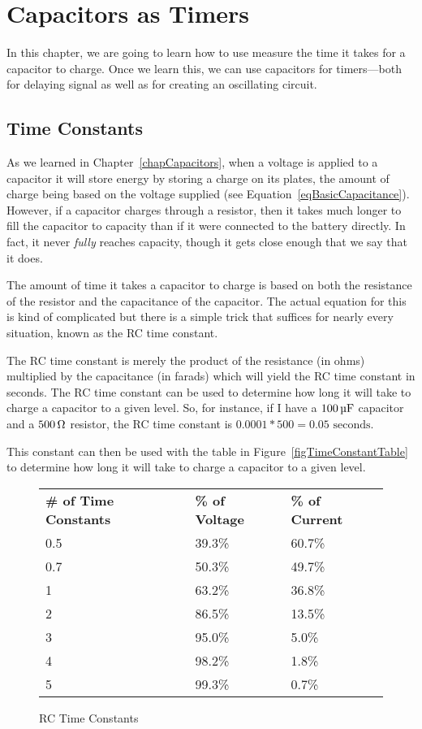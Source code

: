 \chapter{Capacitors as Timers}
\label{chapCapacitorTimer}

In this chapter, we are going to learn how to use measure the time it takes for a capacitor to charge.  
Once we learn this, we can use capacitors for timers---both for delaying signal as well as for creating an oscillating circuit.

\section{Time Constants}

As we learned in Chapter~\ref{chapCapacitors}, when a voltage is applied to a capacitor it will store energy by storing a charge on its plates, the amount of charge being based on the voltage supplied (see Equation~\ref{eqBasicCapacitance}).
However, if a capacitor charges through a resistor, then it takes much longer to fill the capacitor to capacity than if it were connected to the battery directly.
In fact, it never \emph{fully} reaches capacity, though it gets close enough that we say that it does.

The amount of time it takes a capacitor to charge is based on both the resistance of the resistor and the capacitance of the capacitor.
The actual equation for this is kind of complicated but there is a simple trick that suffices for nearly every situation, known as the RC time constant.

The RC time constant is merely the product of the resistance (in ohms) multiplied by the capacitance (in farads) which will yield the RC time constant in seconds.
The RC time constant can be used to determine how long it will take to charge a capacitor to a given level.
So, for instance, if I have a $100\,\si{\micro\farad}$ capacitor and a $500\,\si{\ohm}$ resistor, the RC time constant is $0.0001 * 500 = 0.05\textrm{ seconds}$.

This constant can then be used with the table in Figure~\ref{figTimeConstantTable} to determine how long it will take to charge a capacitor to a given level.

\begin{figure}
\caption{RC Time Constants}
\begin{tabular}{|l|l|l}
\textbf{\# of Time Constants} & \textbf{\% of Voltage} & \textbf{\% of Current} \\
0.5 & 39.3\% & 60.7\% \\
0.7 & 50.3\% & 49.7\% \\
1 & 63.2\% & 36.8\% \\
2 & 86.5\% & 13.5\% \\
3 & 95.0\% & 5.0\% \\
4 & 98.2\% & 1.8\% \\
5 & 99.3\% & 0.7\% \\
\end{tabular}
\end{figure}

